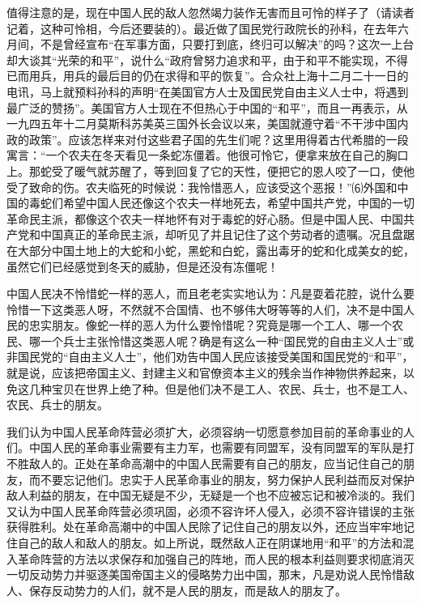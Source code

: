 \documentclass[UTF-8, a5paper, 12pt]{ctexart}
\begin{document}
值得注意的是，现在中国人民的敌人忽然竭力装作无害而且可怜的样子了（请读者记着，这种可怜相，今后还要装的）。最近做了国民党行政院长的孙科，在去年六月间，不是曾经宣布“在军事方面，只要打到底，终归可以解决”的吗？这次一上台却大谈其“光荣的和平”，说什么“政府曾努力追求和平，由于和平不能实现，不得已而用兵，用兵的最后目的仍在求得和平的恢复”。合众社上海十二月二十一日的电讯，马上就预料孙科的声明“在美国官方人士及国民党自由主义人士中，将遇到最广泛的赞扬”。美国官方人士现在不但热心于中国的“和平”，而且一再表示，从一九四五年十二月莫斯科苏美英三国外长会议以来，美国就遵守着“不干涉中国内政的政策”。应该怎样来对付这些君子国的先生们呢？这里用得着古代希腊的一段寓言：“一个农夫在冬天看见一条蛇冻僵着。他很可怜它，便拿来放在自己的胸口上。那蛇受了暖气就苏醒了，等到回复了它的天性，便把它的恩人咬了一口，使他受了致命的伤。农夫临死的时候说：我怜惜恶人，应该受这个恶报！”⑹外国和中国的毒蛇们希望中国人民还像这个农夫一样地死去，希望中国共产党，中国的一切革命民主派，都像这个农夫一样地怀有对于毒蛇的好心肠。但是中国人民、中国共产党和中国真正的革命民主派，却听见了并且记住了这个劳动者的遗嘱。况且盘踞在大部分中国土地上的大蛇和小蛇，黑蛇和白蛇，露出毒牙的蛇和化成美女的蛇，虽然它们已经感觉到冬天的威胁，但是还没有冻僵呢！

中国人民决不怜惜蛇一样的恶人，而且老老实实地认为：凡是耍着花腔，说什么要怜惜一下这类恶人呀，不然就不合国情、也不够伟大呀等等的人们，决不是中国人民的忠实朋友。像蛇一样的恶人为什么要怜惜呢？究竟是哪一个工人、哪一个农民、哪一个兵士主张怜惜这类恶人呢？确是有这么一种“国民党的自由主义人士”或非国民党的“自由主义人士”，他们劝告中国人民应该接受美国和国民党的“和平”，就是说，应该把帝国主义、封建主义和官僚资本主义的残余当作神物供养起来，以免这几种宝贝在世界上绝了种。但是他们决不是工人、农民、兵士，也不是工人、农民、兵士的朋友。

我们认为中国人民革命阵营必须扩大，必须容纳一切愿意参加目前的革命事业的人们。中国人民的革命事业需要有主力军，也需要有同盟军，没有同盟军的军队是打不胜敌人的。正处在革命高潮中的中国人民需要有自己的朋友，应当记住自己的朋友，而不要忘记他们。忠实于人民革命事业的朋友，努力保护人民利益而反对保护敌人利益的朋友，在中国无疑是不少，无疑是一个也不应被忘记和被冷淡的。我们又认为中国人民革命阵营必须巩固，必须不容许坏人侵入，必须不容许错误的主张获得胜利。处在革命高潮中的中国人民除了记住自己的朋友以外，还应当牢牢地记住自己的敌人和敌人的朋友。如上所说，既然敌人正在阴谋地用“和平”的方法和混入革命阵营的方法以求保存和加强自己的阵地，而人民的根本利益则要求彻底消灭一切反动势力并驱逐美国帝国主义的侵略势力出中国，那末，凡是劝说人民怜惜敌人、保存反动势力的人们，就不是人民的朋友，而是敌人的朋友了。
\end{document}
